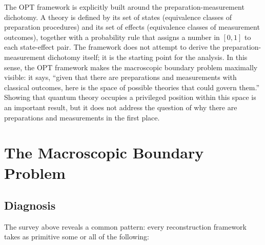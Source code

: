 \documentclass[12pt,a4paper,twoside]{article}
\begin{document}
The OPT framework is explicitly built around the preparation-measurement dichotomy. A theory is defined by its set of states (equivalence classes of preparation procedures) and its set of effects (equivalence classes of measurement outcomes), together with a probability rule that assigns a number in $[0,1]$ to each state-effect pair. The framework does not attempt to derive the preparation-measurement dichotomy itself; it is the starting point for the analysis. In this sense, the OPT framework makes the macroscopic boundary problem maximally visible: it says, ``given that there are preparations and measurements with classical outcomes, here is the space of possible theories that could govern them.'' Showing that quantum theory occupies a privileged position within this space is an important result, but it does not address the question of why there are preparations and measurements in the first place.

\section{The Macroscopic Boundary Problem}

\subsection{Diagnosis}

The survey above reveals a common pattern: every reconstruction framework takes as primitive some or all of the following:
\end{document}
